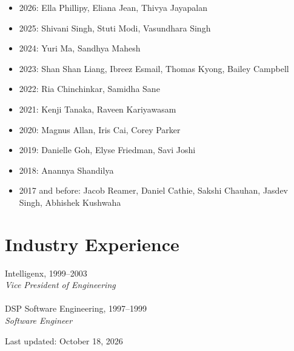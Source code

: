\documentclass[10pt,letterpaper]{article}
\def\cvupdated{October 18, 2026}
\begin{document}
\begin{itemize}
\begin{itemize}
  \item 2026: Ella Phillipy, Eliana Jean, Thivya Jayapalan
  \item 2025: Shivani Singh, Stuti Modi, Vasundhara Singh
  \item 2024: Yuri Ma, Sandhya Mahesh
  \item 2023: Shan Shan Liang, Ibreez Esmail, Thomas Kyong, Bailey Campbell
  \item 2022: Ria Chinchinkar, Samidha Sane
  \item 2021: Kenji Tanaka, Raveen Kariyawasam
  \item 2020: Magnus Allan, Iris Cai, Corey Parker
  \item 2019: Danielle Goh, Elyse Friedman, Savi Joshi
  \item 2018: Anannya Shandilya
  \item 2017 and before: Jacob Reamer, Daniel Cathie, Sakshi Chauhan, Jasdev Singh, Abhishek Kushwaha
  \end{itemize}
\end{itemize}


\section*{Industry Experience}
Intelligenx, 1999--2003 \\
\textit{Vice President of Engineering}\\
\\
DSP Software Engineering, 1997--1999 \\
\textit{Software Engineer}

\vfill
{\small Last updated: \cvupdated}
\end{document}
